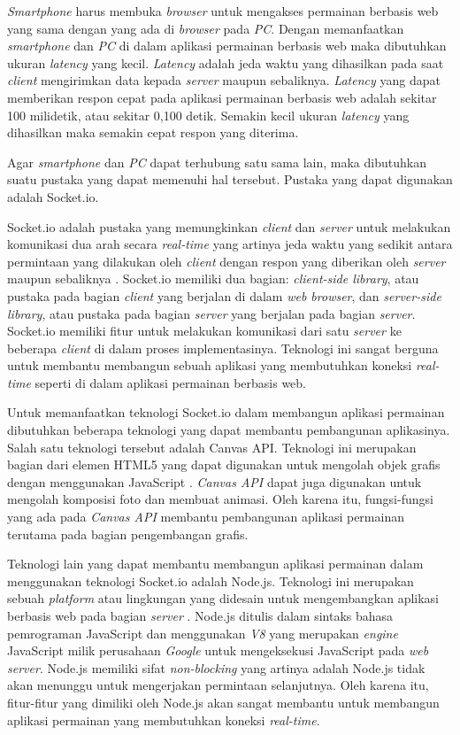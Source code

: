 \textit{Smartphone} harus membuka \textit{browser} untuk mengakses permainan berbasis web yang sama dengan yang ada di \textit{browser} pada \textit{PC}. Dengan memanfaatkan \textit{smartphone} dan \textit{PC} di dalam aplikasi permainan berbasis web maka dibutuhkan ukuran \textit{latency} yang kecil. \textit{Latency} adalah jeda waktu yang dihasilkan pada saat \textit{client} mengirimkan data kepada \textit{server} maupun sebaliknya. \textit{Latency} yang dapat memberikan respon cepat pada aplikasi permainan berbasis web adalah sekitar 100 milidetik, atau sekitar 0,100 detik. Semakin kecil ukuran \textit{latency} yang dihasilkan maka semakin cepat respon yang diterima.

Agar \textit{smartphone} dan \textit{PC} dapat terhubung satu sama lain, maka dibutuhkan suatu pustaka yang dapat memenuhi hal tersebut. Pustaka yang dapat digunakan adalah Socket.io.

Socket.io adalah pustaka yang memungkinkan \textit{client} dan \textit{server} untuk melakukan komunikasi dua arah secara \textit{real-time} yang artinya jeda waktu yang sedikit antara permintaan yang dilakukan oleh \textit{client} dengan respon yang diberikan oleh \textit{server} maupun sebaliknya  \cite{damien:11:socketiodocs}. Socket.io memiliki dua bagian: \textit{client-side library}, atau pustaka pada bagian \textit{client} yang berjalan di dalam \textit{web browser}, dan \textit{server-side library}, atau pustaka pada bagian \textit{server} yang berjalan pada bagian \textit{server}. Socket.io memiliki fitur untuk melakukan komunikasi dari satu \textit{server} ke beberapa \textit{client} di dalam proses implementasinya. Teknologi ini sangat berguna untuk membantu membangun sebuah aplikasi yang membutuhkan koneksi \textit{real-time} seperti di dalam aplikasi permainan berbasis web.

Untuk memanfaatkan teknologi Socket.io dalam membangun aplikasi permainan dibutuhkan beberapa teknologi yang dapat membantu pembangunan aplikasinya. Salah satu teknologi tersebut adalah Canvas API. Teknologi ini merupakan bagian dari elemen HTML5 yang dapat digunakan untuk mengolah objek grafis dengan menggunakan JavaScript \cite{moz:04:canvasapi}. \textit{Canvas API} dapat juga digunakan untuk mengolah komposisi foto dan membuat animasi. Oleh karena itu, fungsi-fungsi yang ada pada \textit{Canvas API} membantu pembangunan aplikasi permainan terutama pada bagian pengembangan grafis.

Teknologi lain yang dapat membantu membangun aplikasi permainan dalam menggunakan teknologi Socket.io adalah Node.js. Teknologi ini merupakan sebuah \textit{platform} atau lingkungan yang didesain untuk mengembangkan aplikasi berbasis web pada bagian \textit{server} \cite{nodeFound:09:nodejsdocs}. Node.js ditulis dalam sintaks bahasa pemrograman JavaScript dan menggunakan \textit{V8} yang merupakan \textit{engine} JavaScript milik perusahaan \textit{Google} untuk mengeksekusi JavaScript pada \textit{web server}. Node.js memiliki sifat \textit{non-blocking} yang artinya adalah Node.js tidak akan menunggu untuk mengerjakan permintaan selanjutnya. Oleh karena itu, fitur-fitur yang dimiliki oleh Node.js akan sangat membantu untuk membangun aplikasi permainan yang membutuhkan koneksi \textit{real-time}.

